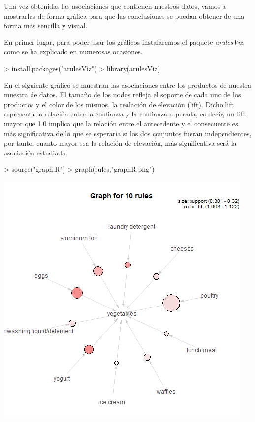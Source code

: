\documentclass [a4paper] {article}
\begin{document}
{\bigskip
Una vez obtenidas las asociaciones que contienen nuestros datos, vamos a mostrarlas de forma gráfica para que las conclusiones
se puedan obtener de una forma más sencilla y visual.

\bigskip
En primer lugar, para poder usar los gráficos instalaremos el paquete \textit{arulesViz}, como se ha explicado en numerosas
ocasiones.
\begin{Schunk}
\begin{Sinput}
> install.packages("arulesViz")
> library(arulesViz)
\end{Sinput}
\end{Schunk}

\bigskip
En el siguiente gráfico se muestran las asociaciones entre los productos de nuestra muestra de datos. El tamaño de los nodos
refleja el soporte de cada uno de los productos y el color de los mismos, la realación de elevación (lift). Dicho lift representa 
la relación entre la confianza y la confianza esperada, es decir, un lift mayor que 1.0 implica que la relación entre el antecedente 
y el consecuente es más significativa de lo que se esperaría si los dos conjuntos fueran independientes, por tanto, cuanto mayor
sea la relación de elevación, más significativa será la asociación estudiada.
\begin{Schunk}
\begin{Sinput}
> source("graph.R")
> graph(rules,"graphR.png")
\end{Sinput}
\end{Schunk}
\includegraphics[width=\textwidth]{graphR}

}
\end{document}

